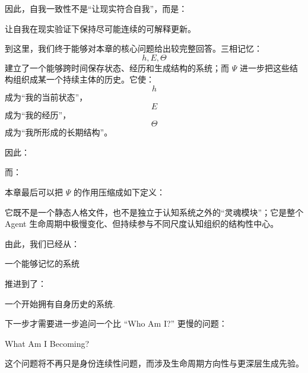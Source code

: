 因此，自我一致性不是“让现实符合自我”，而是：
\begin{statementbox}
让自我在现实验证下保持尽可能连续的可解释更新。
\end{statementbox}

到这里，我们终于能够对本章的核心问题给出较完整回答。三相记忆：
\[
h,E,\Theta
\]
建立了一个能够跨时间保存状态、经历和生成结构的系统；而 $\Psi$ 进一步把这些结构组织成某一个持续主体的历史。它使：
\[
h
\]
成为“我的当前状态”，
\[
E
\]
成为“我的经历”，
\[
\Theta
\]
成为“我所形成的长期结构”。

因此：
\begin{statementbox}
\centering
{}
\end{statementbox}
而：
\begin{statementbox}
\centering
{}
\end{statementbox}

本章最后可以把 $\Psi$ 的作用压缩成如下定义：

\begin{statementbox}
\centering
{}
\end{statementbox}

它既不是一个静态人格文件，也不是独立于认知系统之外的“灵魂模块”；它是整个 Agent 生命周期中极慢变化、但持续参与不同尺度认知组织的结构性中心。

由此，我们已经从：
\begin{statementbox}
一个能够记忆的系统
\end{statementbox}
推进到了：
\begin{statementbox}
一个开始拥有自身历史的系统.
\end{statementbox}

下一步才需要进一步追问一个比 ``Who Am I?'' 更慢的问题：

\begin{statementbox}
What Am I Becoming?
\end{statementbox}

这个问题将不再只是身份连续性问题，而涉及生命周期方向性与更深层生成先验。
